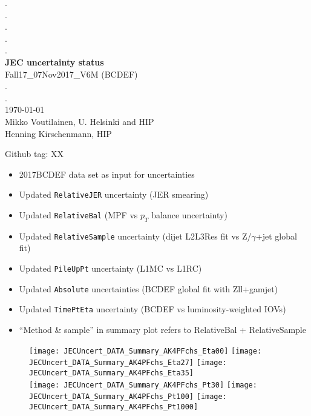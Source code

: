 \documentclass[landscape,10pt]{beamer} %
\begin{document}
\begin{centering}
{. }\\
{. }\\
{. }\\
{. }\\
{. }\\
{\bf JEC uncertainty status}\\
Fall17\_07Nov2017\_V6M (BCDEF)\\
.\\
.\\
\today\\
Mikko Voutilainen, U. Helsinki and HIP\\
Henning Kirschenmann, HIP\\
\end{centering}

\newpage

Github tag: XX

\begin{itemize}
\item 2017BCDEF data set as input for uncertainties
\item Updated \verb|RelativeJER| uncertainty (JER smearing)
\item Updated \verb|RelativeBal| (MPF vs $p_T$ balance uncertainty)
\item Updated \verb|RelativeSample| uncertainty (dijet L2L3Res fit vs Z/$\gamma$+jet global fit)
\item Updated \verb|PileUpPt| uncertainty (L1MC vs L1RC)
\item Updated \verb|Absolute| uncertainties (BCDEF global fit with Zll+gamjet)
\item Updated \verb|TimePtEta| uncertainty (BCDEF vs luminosity-weighted IOVs)
\item ``Method \& sample'' in summary plot refers to RelativeBal + RelativeSample
\end{itemize}

\newpage

\begin{figure}[p]
\centering
  \texttt{[image: JECUncert\_DATA\_Summary\_AK4PFchs\_Eta00]}
  \texttt{[image: JECUncert\_DATA\_Summary\_AK4PFchs\_Eta27]}
  \texttt{[image: JECUncert\_DATA\_Summary\_AK4PFchs\_Eta35]}\\
  \texttt{[image: JECUncert\_DATA\_Summary\_AK4PFchs\_Pt30]}
  \texttt{[image: JECUncert\_DATA\_Summary\_AK4PFchs\_Pt100]}
  \texttt{[image: JECUncert\_DATA\_Summary\_AK4PFchs\_Pt1000]}
\end{figure}
\end{document}
